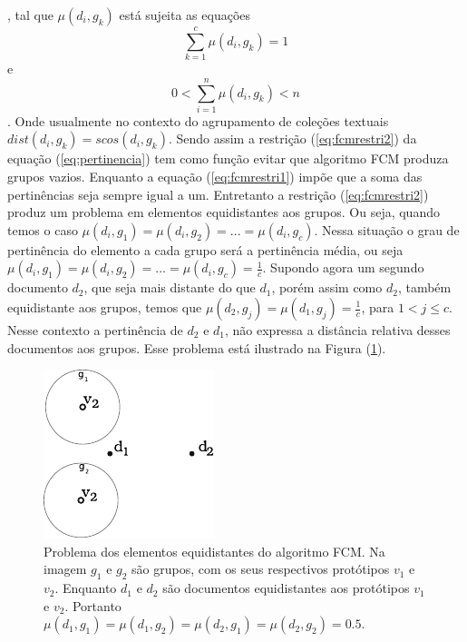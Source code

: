 , tal que $\mu(d_i, g_k)$ está sujeita as equações \begin{equation} \sum_{k=1}^c
\mu(d_i,g_k) = 1 \label{eq:fcmrestri1} \end{equation} e \begin{equation} 0 < \sum_{i=1}^n
\mu(d_i,g_k) < n \label{eq:fcmrestri2} \end{equation} . Onde usualmente no contexto do
agrupamento de coleções textuais $dist(d_i,g_k) = scos(d_i,g_k)$.  Sendo assim a restrição
(\ref{eq:fcmrestri2}) da equação (\ref{eq:pertinencia}) tem como função evitar que algoritmo
FCM produza grupos vazios\cite{Nogueira2013}. Enquanto a equação (\ref{eq:fcmrestri1}) impõe
que a soma das pertinências seja sempre igual a um.  Entretanto a restrição
(\ref{eq:fcmrestri2}) produz um problema em elementos equidistantes aos grupos. Ou seja,
quando temos o caso $\mu(d_i, g_1) = \mu(d_i, g_2) = ... = \mu(d_i, g_c)$. Nessa situação o grau de
pertinência do elemento a cada grupo será a pertinência média, ou seja $\mu(d_i, g_1) = \mu(d_i,
g_2) = ... = \mu(d_i, g_c) = \frac{1}{c}$. Supondo agora um segundo documento $d_2$, que seja mais
distante do que $d_1$, porém assim como $d_2$, também equidistante aos grupos, temos que $\mu(d_2,
g_j) = \mu(d_1, g_j) = \frac{1}{c}$, para $1 < j \leq c$. Nesse contexto a pertinência de $d_2$ e
$d_1$, não expressa a distância relativa desses documentos aos grupos. Esse problema está ilustrado
na Figura (\ref{fig:fcm_problem}).

\begin{figure}[!htp] \centering
  \includegraphics[width=0.4\columnwidth]{assets/clusters_fcm_problem.pdf} 
  \caption{Problema dos
    elementos equidistantes do algoritmo FCM. Na imagem $g_1$ e $g_2$ são grupos, com os seus
    respectivos protótipos $v_1$ e $v_2$. Enquanto $d_1$ e $d_2$ são documentos equidistantes aos
    protótipos $v_1$ e $v_2$. Portanto $\mu(d_1,g_1) = \mu(d_1,g_2) = \mu(d_2,g_1) = \mu(d_2,g_2) =
0.5$.} 
  \label{fig:fcm_problem} 
\end{figure}

